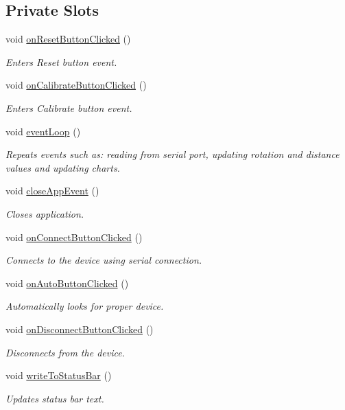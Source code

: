 \subsection*{Private Slots}
\begin{DoxyCompactItemize}
\item 
void \mbox{\hyperlink{class_main_window_a680f2fc34bd2147a3a675060aca0fbc6}{on\+Reset\+Button\+Clicked}} ()
\begin{DoxyCompactList}\small\item\em Enters Reset button event. \end{DoxyCompactList}\item 
void \mbox{\hyperlink{class_main_window_ac895c6f8aae08ca6debe77314d640936}{on\+Calibrate\+Button\+Clicked}} ()
\begin{DoxyCompactList}\small\item\em Enters Calibrate button event. \end{DoxyCompactList}\item 
void \mbox{\hyperlink{class_main_window_a92ea4484e5fd9b2d41fe08d2aef4c459}{event\+Loop}} ()
\begin{DoxyCompactList}\small\item\em Repeats events such as\+: reading from serial port, updating rotation and distance values and updating charts. \end{DoxyCompactList}\item 
void \mbox{\hyperlink{class_main_window_aa23e4e2f222120878dc47b594292bb8c}{close\+App\+Event}} ()
\begin{DoxyCompactList}\small\item\em Closes application. \end{DoxyCompactList}\item 
void \mbox{\hyperlink{class_main_window_a3546900c922ca780ef575dd9aa8f9906}{on\+Connect\+Button\+Clicked}} ()
\begin{DoxyCompactList}\small\item\em Connects to the device using serial connection. \end{DoxyCompactList}\item 
void \mbox{\hyperlink{class_main_window_a0a8956278b58c085e0ff06d2edcd739c}{on\+Auto\+Button\+Clicked}} ()
\begin{DoxyCompactList}\small\item\em Automatically looks for proper device. \end{DoxyCompactList}\item 
void \mbox{\hyperlink{class_main_window_a15190e6af528cd13ddbe387800531ba4}{on\+Disconnect\+Button\+Clicked}} ()
\begin{DoxyCompactList}\small\item\em Disconnects from the device. \end{DoxyCompactList}\item 
void \mbox{\hyperlink{class_main_window_ac7fc0a361faba82837af50f2dd1b4ef4}{write\+To\+Status\+Bar}} ()
\begin{DoxyCompactList}\small\item\em Updates status bar text. \end{DoxyCompactList}\end{DoxyCompactItemize}
